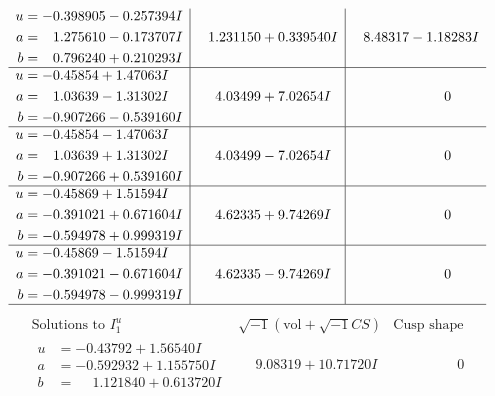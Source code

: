 \documentclass[1p]{elsarticle_modified}
\theoremstyle{definition}
\newcommand{\I}{\sqrt{-1}}
\begin{document}
$$\begin{array}{c|c|c}
\begin{aligned}
u &= -0.398905 - 0.257394 I \\
a &= \phantom{-}1.275610 - 0.173707 I \\
b &= \phantom{-}0.796240 + 0.210293 I\end{aligned}
 & \phantom{-}1.231150 + 0.339540 I & \phantom{-}8.48317 - 1.18283 I \\ \hline\begin{aligned}
u &= -0.45854 + 1.47063 I \\
a &= \phantom{-}1.03639 - 1.31302 I \\
b &= -0.907266 - 0.539160 I\end{aligned}
 & \phantom{-}4.03499 + 7.02654 I & \phantom{-0.000000 } 0 \\ \hline\begin{aligned}
u &= -0.45854 - 1.47063 I \\
a &= \phantom{-}1.03639 + 1.31302 I \\
b &= -0.907266 + 0.539160 I\end{aligned}
 & \phantom{-}4.03499 - 7.02654 I & \phantom{-0.000000 } 0 \\ \hline\begin{aligned}
u &= -0.45869 + 1.51594 I \\
a &= -0.391021 + 0.671604 I \\
b &= -0.594978 + 0.999319 I\end{aligned}
 & \phantom{-}4.62335 + 9.74269 I & \phantom{-0.000000 } 0 \\ \hline\begin{aligned}
u &= -0.45869 - 1.51594 I \\
a &= -0.391021 - 0.671604 I \\
b &= -0.594978 - 0.999319 I\end{aligned}
 & \phantom{-}4.62335 - 9.74269 I & \phantom{-0.000000 } 0\\
 \hline 
 \end{array}$$\newpage$$\begin{array}{c|c|c}  
\text{Solutions to }I^u_{1}& \I (\text{vol} + \sqrt{-1}CS) & \text{Cusp shape}\\
 \hline 
\begin{aligned}
u &= -0.43792 + 1.56540 I \\
a &= -0.592932 + 1.155750 I \\
b &= \phantom{-}1.121840 + 0.613720 I\end{aligned}
 & \phantom{-}9.08319 + 10.71720 I & \phantom{-0.000000 } 0 \\ \hline\begin{aligned}

\end{aligned}
\end{array}$$
\end{document}
